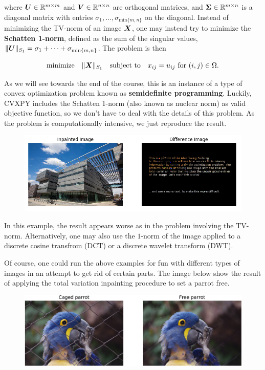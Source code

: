 \begin{example}
where $\bm{U}\in \mathbb{R}^{m\times m}$ and $\bm{V}\in \mathbb{R}^{n\times n}$ are orthogonal matrices, and $\bm{\Sigma}\in \mathbb{R}^{m\times n}$ is a diagonal matrix with entries $\sigma_{1},\dots,\sigma_{\mathrm{min}\{m,n\}}$ on the diagonal. Instead of minimizing the TV-norm of an image $\bm{X}$, one may instead try to minimize the \textbf{Schatten 1-norm}, defined as the sum of the singular values, $\|\bm{U}\|_{S_1} = \sigma_1+\cdots+\sigma_{\mathrm{min}\{m,n\}}$. The problem is then

\begin{equation*}
  \text{minimize}\quad \|\bm{X}\|_{S_1} \quad\text{subject to}\quad x_{ij} = u_{ij} \text{ for } (i,j) \in \Omega.
\end{equation*}

As we will see towards the end of the course, this is an instance of a type of convex optimization problem known as \textbf{semidefinite programming}. Luckily, CVXPY includes the Schatten 1-norm (also known as nuclear norm) as valid objective function, so we don't have to deal with the details of this problem. As the problem is computationally intensive, we just reproduce the result.

\begin{figure}[h!]
\centering
\includegraphics[width=1\textwidth]{images/nucnorm-inpaint.png}
\end{figure}

In this example, the result appears worse as in the problem involving the TV-norm. Alternatively, one may also use the $1$-norm of the image applied to a discrete cosine transfrom (DCT) or a discrete wavelet transform (DWT).

Of course, one could run the above examples for fun with different types of images in an attempt to get rid of certain parts. The image below show the result of applying the total variation inpainting procedure to set a parrot free.

\begin{figure}[h!]
\centering
\includegraphics[width=1\textwidth]{images/parrot-crop.pdf}
\end{figure}
\end{example}


